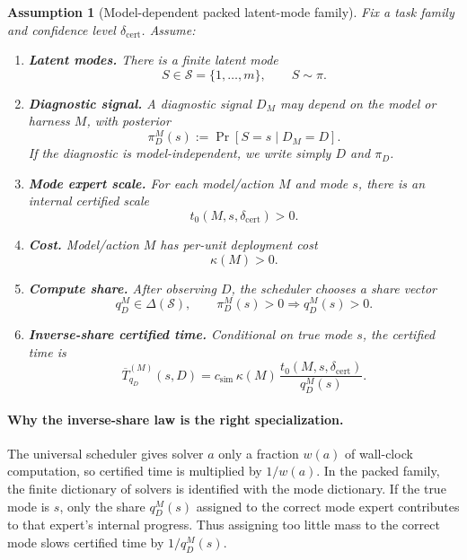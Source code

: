 \documentclass{article}
\newtheorem{assumption}{Assumption}
\newcommand{\cS}{\mathcal{S}}
\begin{document}
\begin{assumption}[Model-dependent packed latent-mode family]
\label{ass:app-packed-model}
Fix a task family and confidence level \(\delta_{\mathrm{cert}}\).
Assume:
\begin{enumerate}[leftmargin=1.25em,itemsep=0.15em]
    \item \textbf{Latent modes.}
    There is a finite latent mode
    \[
        S\in\cS=\{1,\ldots,m\},
        \qquad
        S\sim\pi.
    \]
    \item \textbf{Diagnostic signal.}
    A diagnostic signal \(D_M\) may depend on the model or harness \(M\), with posterior
    \[
        \pi_D^M(s):=\Pr[S=s\mid D_M=D].
    \]
    If the diagnostic is model-independent, we write simply \(D\) and \(\pi_D\).
    \item \textbf{Mode expert scale.}
    For each model/action \(M\) and mode \(s\), there is an internal certified scale
    \[
        t_0(M,s,\delta_{\mathrm{cert}})>0.
    \]
    \item \textbf{Cost.}
    Model/action \(M\) has per-unit deployment cost
    \[
        \kappa(M)>0.
    \]
    \item \textbf{Compute share.}
    After observing \(D\), the scheduler chooses a share vector
    \[
        q_D^M\in\Delta(\cS),
        \qquad
        \pi_D^M(s)>0\Rightarrow q_D^M(s)>0.
    \]
    \item \textbf{Inverse-share certified time.}
    Conditional on true mode \(s\), the certified time is
    \[
        \overline T^{(M)}_{q_D}(s,D)
        =
        c_{\mathrm{sim}}\,
        \kappa(M)\,
        \frac{t_0(M,s,\delta_{\mathrm{cert}})}{q_D^M(s)}.
    \]
\end{enumerate}
\end{assumption}

\paragraph{Why the inverse-share law is the right specialization.}
The universal scheduler gives solver \(a\) only a fraction \(w(a)\) of wall-clock computation,
so certified time is multiplied by \(1/w(a)\).
In the packed family, the finite dictionary of solvers is identified with the mode dictionary.
If the true mode is \(s\), only the share \(q_D^M(s)\) assigned to the correct mode expert
contributes to that expert's internal progress.
Thus assigning too little mass to the correct mode slows certified time by \(1/q_D^M(s)\).
\end{document}
